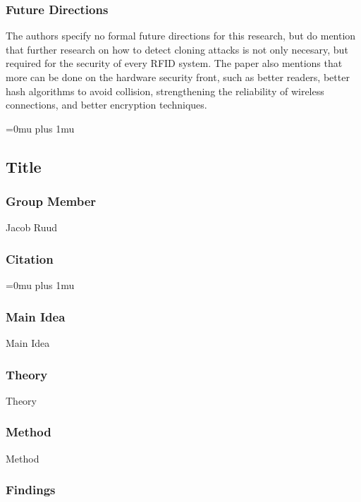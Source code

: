 \subsubsection{Future Directions}

\noindent
 The authors specify no formal future directions for this research, but do mention that further research on how to detect cloning attacks is not only necesary, but required for the security of every RFID system.  The paper also mentions that more can be done on the hardware security front, such as better readers, better hash algorithms to avoid collision, strengthening the reliability of wireless connections, and better encryption techniques. 

\Urlmuskip=0mu plus 1mu\relax

\noindent
\subsection{Title}

\subsubsection{Group Member}

\noindent
Jacob Ruud

\noindent
\subsubsection{Citation}

\Urlmuskip=0mu plus 1mu\relax

\subsubsection{Main Idea}

\noindent
Main Idea

\subsubsection{Theory}

\noindent
Theory

\subsubsection{Method}

\noindent
Method

\subsubsection{Findings}

